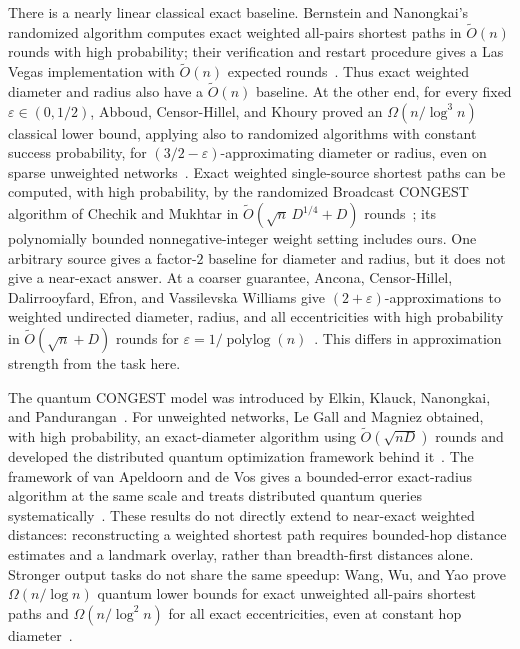 \documentclass[11pt]{article}
\theoremstyle{definition}
\newcommand{\eps}{\varepsilon}
\newcommand{\polylog}{\operatorname{polylog}}
\newcommand{\wtO}{\widetilde O}
\begin{document}
There is a nearly linear classical exact baseline.  Bernstein and Nanongkai's
randomized algorithm computes exact weighted all-pairs shortest paths in
$\wtO(n)$ rounds with high probability; their verification and restart
procedure gives a Las Vegas implementation with $\wtO(n)$ expected
rounds~\cite{BernsteinNanongkai2019}.  Thus exact weighted diameter and radius
also have a $\wtO(n)$ baseline.  At the other end, for every fixed
$\eps\in(0,1/2)$, Abboud, Censor-Hillel, and Khoury proved an
$\Omega(n/\log^3 n)$ classical lower bound, applying also to randomized
algorithms with constant success probability, for
$(3/2-\eps)$-approximating diameter or radius, even on sparse unweighted
networks~\cite{AbboudCensorHillelKhoury2016}.  Exact weighted single-source
shortest paths can be computed, with high probability, by the randomized
Broadcast CONGEST algorithm of Chechik and Mukhtar in
$\wtO(\sqrt n\,D^{1/4}+D)$ rounds~\cite{ChechikMukhtar2020}; its
polynomially bounded nonnegative-integer weight setting includes ours.  One
arbitrary source gives a factor-$2$ baseline for diameter and radius, but it
does not give a near-exact answer.
At a coarser guarantee, Ancona, Censor-Hillel, Dalirrooyfard, Efron, and
Vassilevska Williams give $(2+\eps)$-approximations to weighted undirected
diameter, radius, and all eccentricities with high probability in
$\wtO(\sqrt n+D)$ rounds for
$\eps=1/\polylog(n)$~\cite{AnconaEtAl2021}.  This differs in approximation
strength from the task here.

The quantum CONGEST model was introduced by Elkin, Klauck, Nanongkai, and
Pandurangan~\cite{ElkinEtAl2014}.  For unweighted networks, Le Gall and
Magniez obtained, with high probability, an exact-diameter algorithm using
$\wtO(\sqrt{nD})$ rounds and developed the distributed quantum optimization
framework behind it~\cite{LeGallMagniez2018}.  The framework of van Apeldoorn
and de Vos gives a bounded-error exact-radius algorithm at the same scale and
treats distributed quantum queries
systematically~\cite{vanApeldoornDeVos2022}.  These results do
not directly extend to near-exact weighted distances: reconstructing a
weighted shortest path requires bounded-hop distance estimates and a landmark
overlay, rather than breadth-first distances alone.  Stronger output tasks do
not share the same speedup: Wang, Wu, and Yao prove
$\Omega(n/\log n)$ quantum lower bounds for exact unweighted all-pairs
shortest paths and $\Omega(n/\log^2 n)$ for all exact eccentricities, even at
constant hop diameter~\cite{WangWuYao2021}.
\end{document}
